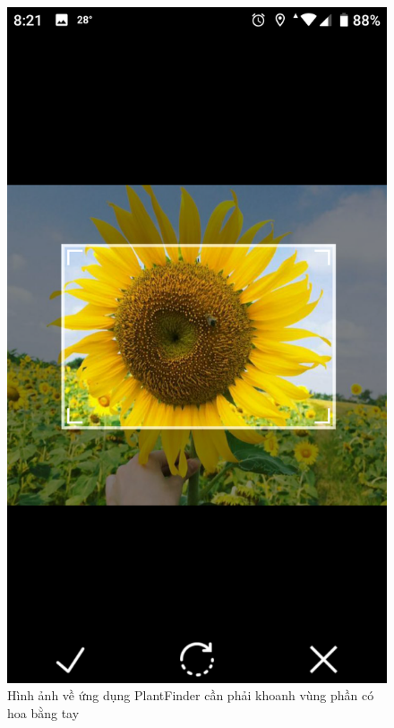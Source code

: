 \documentclass[12pt]{report}
\begin{document}
		\begin{figure}[h]
			\centering
			\includegraphics[scale=0.13]{app_1}
			\caption{Hình ảnh về ứng dụng PlantFinder cần phải khoanh vùng phần có hoa bằng tay}
			\label{fig:app_crop}
		\end{figure}
																		
\end{document}
